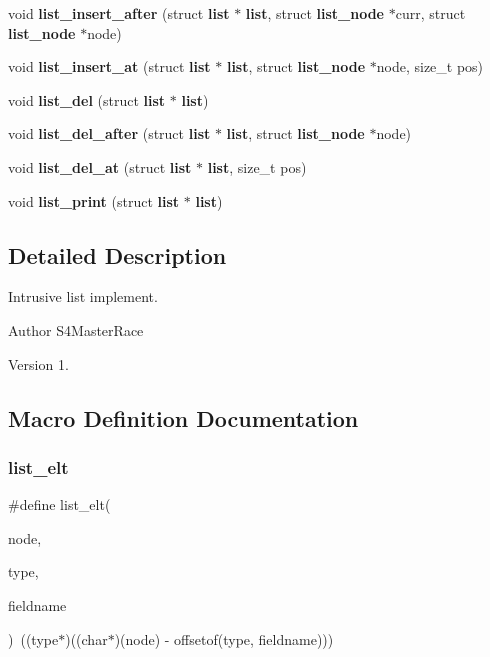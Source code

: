 \begin{DoxyCompactItemize}
\item 
void \textbf{ list\+\_\+insert\+\_\+after} (struct \textbf{ list} $\ast$\textbf{ list}, struct \textbf{ list\+\_\+node} $\ast$curr, struct \textbf{ list\+\_\+node} $\ast$node)
\item 
void \textbf{ list\+\_\+insert\+\_\+at} (struct \textbf{ list} $\ast$\textbf{ list}, struct \textbf{ list\+\_\+node} $\ast$node, size\+\_\+t pos)
\item 
void \textbf{ list\+\_\+del} (struct \textbf{ list} $\ast$\textbf{ list})
\item 
void \textbf{ list\+\_\+del\+\_\+after} (struct \textbf{ list} $\ast$\textbf{ list}, struct \textbf{ list\+\_\+node} $\ast$node)
\item 
void \textbf{ list\+\_\+del\+\_\+at} (struct \textbf{ list} $\ast$\textbf{ list}, size\+\_\+t pos)
\item 
void \textbf{ list\+\_\+print} (struct \textbf{ list} $\ast$\textbf{ list})
\end{DoxyCompactItemize}


\subsection{Detailed Description}
Intrusive list implement. 

\begin{DoxyAuthor}{Author}
S4\+Master\+Race 
\end{DoxyAuthor}
\begin{DoxyVersion}{Version}
1. 
\end{DoxyVersion}


\subsection{Macro Definition Documentation}
\mbox{\label{list_8h_a12e153fb4ee7d1a550fa57a733629eac}} 
\subsubsection{list\+\_\+elt}
{\footnotesize\ttfamily \#define list\+\_\+elt(\begin{DoxyParamCaption}\item[{}]{node,  }\item[{}]{type,  }\item[{}]{fieldname }\end{DoxyParamCaption})~((type$\ast$)((char$\ast$)(node) -\/ offsetof(type, fieldname)))}


